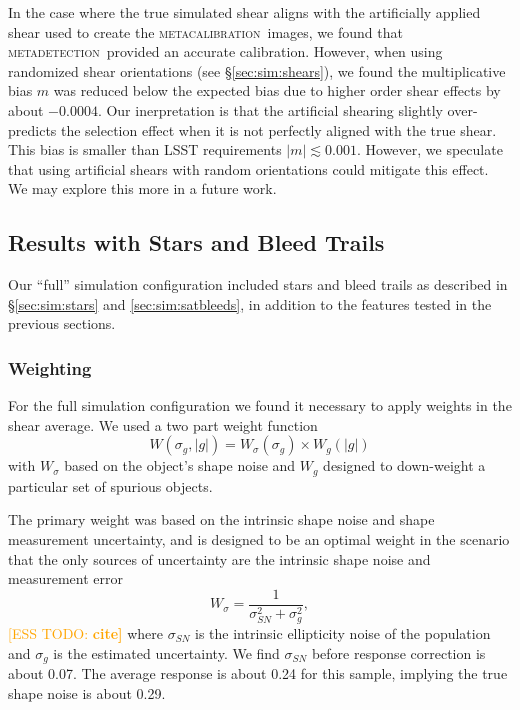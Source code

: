 \documentclass[twocolumn,twocolappendix,astrosym]{openjournal}
\newcommand{\esstodo}[1]{\textcolor{orange}{[ESS TODO: \bf #1]}}
\newcommand{\mcal}{\textsc{metacalibration}}
\newcommand{\mdet}{\textsc{metadetection}}
\begin{document}
In the case where the true simulated shear aligns with the artificially applied
shear used to create the \mcal\ images, we found that \mdet\ provided
an accurate calibration.  However, when using randomized shear
orientations (see \S \ref{sec:sim:shears}), we found the multiplicative bias
$m$ was reduced below the expected bias due to higher order shear effects by
about $-0.0004$.  Our inerpretation is that the artificial shearing slightly
over-predicts the selection effect when it is not perfectly aligned with the
true shear.  This bias is smaller than LSST requirements $|m| \lesssim 0.001$.
However, we speculate that using artificial shears with random orientations
could mitigate this effect.  We may explore this more in a future work.

\subsection{Results with Stars and Bleed Trails} \label{sec:results:full}

Our ``full'' simulation configuration included stars and bleed trails as
described in \S \ref{sec:sim:stars} and \ref{sec:sim:satbleeds}, in addition to
the features tested in the previous sections.

\subsubsection{Weighting}

For the full simulation configuration we found it necessary to apply weights in
the shear average.  We used a two part weight function
\begin{equation}
    W(\sigma_g, |g|) = W_\sigma (\sigma_g) \times W_g(|g|)
\end{equation}
with $W_\sigma$ based on the object's shape noise and $W_g$ designed to
down-weight a particular set of spurious objects.

The primary weight was based on the intrinsic shape noise and shape
measurement uncertainty, and is designed to be an optimal weight in the
scenario that the only sources of uncertainty are the intrinsic shape noise 
and measurement error
\begin{equation}
    W_\sigma = \frac{1}{\sigma_{SN}^2 + \sigma_g^2},
\end{equation}
\esstodo{cite}
where $\sigma_{SN}$ is the intrinsic ellipticity noise of the population
and $\sigma_g$ is the estimated uncertainty.  We find $\sigma_{SN}$
before response correction is about 0.07.  The average response is about
0.24 for this sample, implying the true shape noise is about 0.29.
\end{document}
